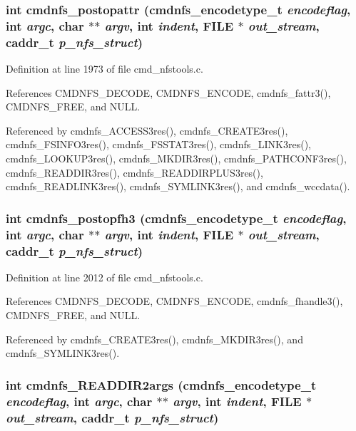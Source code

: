\subsubsection{\setlength{\rightskip}{0pt plus 5cm}int cmdnfs\_\-postopattr ({\bf cmdnfs\_\-encodetype\_\-t} {\em encodeflag}, int {\em argc}, char $\ast$$\ast$ {\em argv}, int {\em indent}, FILE $\ast$ {\em out\_\-stream}, caddr\_\-t {\em p\_\-nfs\_\-struct})}\label{cmd__nfstools_8h_a38}




Definition at line 1973 of file cmd\_\-nfstools.c.

References CMDNFS\_\-DECODE, CMDNFS\_\-ENCODE, cmdnfs\_\-fattr3(), CMDNFS\_\-FREE, and NULL.

Referenced by cmdnfs\_\-ACCESS3res(), cmdnfs\_\-CREATE3res(), cmdnfs\_\-FSINFO3res(), cmdnfs\_\-FSSTAT3res(), cmdnfs\_\-LINK3res(), cmdnfs\_\-LOOKUP3res(), cmdnfs\_\-MKDIR3res(), cmdnfs\_\-PATHCONF3res(), cmdnfs\_\-READDIR3res(), cmdnfs\_\-READDIRPLUS3res(), cmdnfs\_\-READLINK3res(), cmdnfs\_\-SYMLINK3res(), and cmdnfs\_\-wccdata().
\subsubsection{\setlength{\rightskip}{0pt plus 5cm}int cmdnfs\_\-postopfh3 ({\bf cmdnfs\_\-encodetype\_\-t} {\em encodeflag}, int {\em argc}, char $\ast$$\ast$ {\em argv}, int {\em indent}, FILE $\ast$ {\em out\_\-stream}, caddr\_\-t {\em p\_\-nfs\_\-struct})}\label{cmd__nfstools_8h_a39}




Definition at line 2012 of file cmd\_\-nfstools.c.

References CMDNFS\_\-DECODE, CMDNFS\_\-ENCODE, cmdnfs\_\-fhandle3(), CMDNFS\_\-FREE, and NULL.

Referenced by cmdnfs\_\-CREATE3res(), cmdnfs\_\-MKDIR3res(), and cmdnfs\_\-SYMLINK3res().
\subsubsection{\setlength{\rightskip}{0pt plus 5cm}int cmdnfs\_\-READDIR2args ({\bf cmdnfs\_\-encodetype\_\-t} {\em encodeflag}, int {\em argc}, char $\ast$$\ast$ {\em argv}, int {\em indent}, FILE $\ast$ {\em out\_\-stream}, caddr\_\-t {\em p\_\-nfs\_\-struct})}\label{cmd__nfstools_8h_a32}




